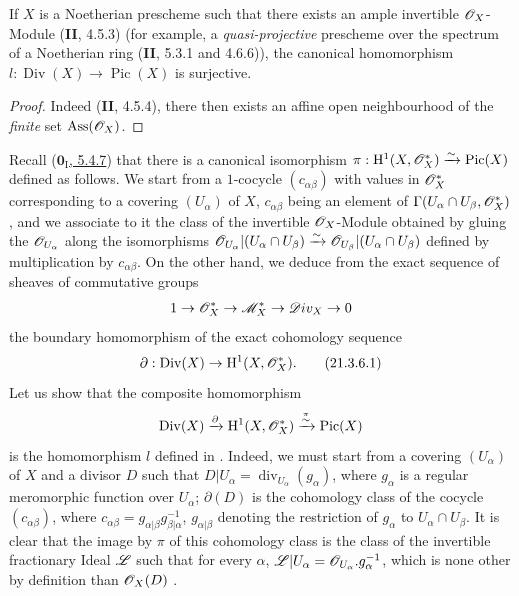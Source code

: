 \begin{corollary}[21.3.5]
\label{IV.21.3.5}
If $X$ is a Noetherian prescheme such that there exists an ample invertible $\mathscr{O}_X$-Module \textup{(\textbf{II}, 4.5.3)} \textup{(for example, a \emph{quasi-projective} prescheme over the spectrum of a Noetherian ring (\textbf{II}, 5.3.1 and 4.6.6))}, the canonical homomorphism $l:\operatorname{Div}(X)\to\operatorname{Pic}(X)$ is surjective.
\end{corollary}

\begin{proof}

Indeed (\textbf{II}, 4.5.4), there then exists an affine open neighbourhood of the \emph{finite} set $\operatorname{Ass}(\mathscr{O}_X)$.
\end{proof}

\begin{remark}[21.3.6]
\label{IV.21.3.6}
Recall (\hyperref[0.5.4.7]{$\mathbf{0}_{\mathrm{I}}$, 5.4.7}) that there is a canonical isomorphism $\pi:\mathrm{H}^1(X,\mathscr{O}_X^*)\xrightarrow{\sim}\operatorname{Pic}(X)$ defined as follows.
We start from a $1$-cocycle $(c_{\alpha\beta})$ with values in $\mathscr{O}_X^*$ corresponding to a covering $(U_\alpha)$ of $X$, $c_{\alpha\beta}$ being an element of $\Gamma(U_\alpha\cap U_\beta,\mathscr{O}_X^*)$, and we associate to it the class of the invertible $\mathscr{O}_X$-Module obtained by gluing the $\mathscr{O}_{U_\alpha}$ along the isomorphisms $\mathscr{O}_{U_\alpha}|(U_\alpha\cap U_\beta)\xrightarrow{\sim}\mathscr{O}_{U_\beta}|(U_\alpha\cap U_\beta)$ defined by multiplication by $c_{\alpha\beta}$.
On the other hand, we deduce from the exact sequence of sheaves of commutative groups
\[
  1\to\mathscr{O}_X^*\to\mathscr{M}_X^*\to\mathscr{D}iv_X\to 0
\]
the boundary homomorphism of the exact cohomology sequence
\[
\label{IV.21.3.6.1}
  \partial:\operatorname{Div}(X)\to\mathrm{H}^1(X,\mathscr{O}_X^*).
  \tag{21.3.6.1}
\]
Let us show that the composite homomorphism
\[
  \operatorname{Div}(X)\xrightarrow{\partial}\mathrm{H}^1(X,\mathscr{O}_X^*)\xrightarrow{\overset{\pi}{\sim}}\operatorname{Pic}(X)
\]
is the homomorphism $l$ defined in .
Indeed, we must start from a covering $(U_\alpha)$ of $X$ and a divisor $D$ such that $D|U_\alpha=\operatorname{div}_{U_\alpha}(g_\alpha)$, where $g_\alpha$ is a regular meromorphic function over $U_\alpha$;
$\partial(D)$ is the cohomology class of the cocycle $(c_{\alpha\beta})$, where $c_{\alpha\beta}=g_{\alpha|\beta}g_{\beta|\alpha}^{-1}$, $g_{\alpha|\beta}$ denoting the restriction of $g_\alpha$ to $U_\alpha\cap U_\beta$.
It is clear that the image by $\pi$ of this cohomology class is the class of the invertible fractionary Ideal $\mathscr{L}$ such that for every $\alpha$, $\mathscr{L}|U_\alpha=\mathscr{O}_{U_\alpha}.g_\alpha^{-1}$, which is none other by definition than $\mathscr{O}_X(D)$ .
\end{remark}

